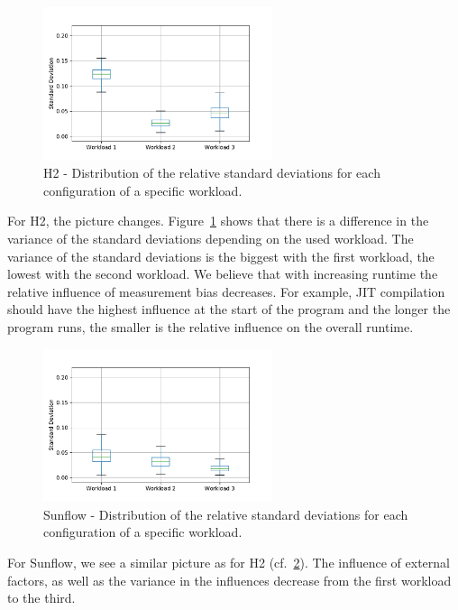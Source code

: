 \begin{figure}[h]
  \centering
  \includegraphics[width=0.6\textwidth]{images/h2_m_infl_wl_012}
  \caption{H2 - Distribution of the relative standard deviations for each configuration of a specific workload.}
  \label{box_measure_infl_h2}
\end{figure}

For H2, the picture changes. Figure~\ref{box_measure_infl_h2} shows that there is a difference in the variance of the standard deviations depending on the used workload. The variance of the standard deviations is the biggest with the first workload, the lowest with the second workload. We believe that with increasing runtime the relative influence of measurement bias decreases. For example, JIT compilation should have the highest influence at the start of the program and the longer the program runs, the smaller is the relative influence on the overall runtime.

\begin{figure}[h]
  \centering
  \includegraphics[width=0.6\textwidth]{images/sunflow_m_infl_wl_012}
  \caption{Sunflow - Distribution of the relative standard deviations for each configuration of a specific workload.}
  \label{box_measure_infl_sunflow}
\end{figure}

For Sunflow, we see a similar picture as for H2 (cf.~\ref{box_measure_infl_sunflow}). The influence of external factors, as well as the variance in the influences decrease from the first workload to the third.

